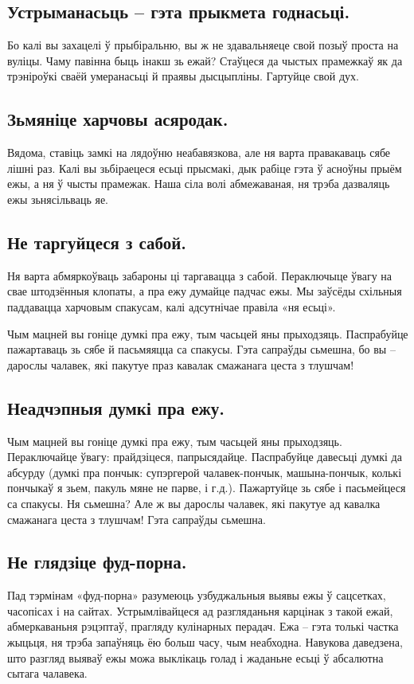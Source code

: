 \subsection{Устрыманасьць – гэта прыкмета годнасьці.}
Бо калі вы захацелі ў прыбіральню, вы ж не здавальняеце свой позыў проста на вуліцы. Чаму павінна быць інакш зь ежай? Стаўцеся да чыстых прамежкаў як да трэніроўкі сваёй умеранасьці й праявы дысцыпліны. Гартуйце свой дух.

\subsection{Зьмяніце харчовы асяродак.}
Вядома, ставіць замкі на лядоўню неабавязкова, але ня варта правакаваць сябе лішні раз. Калі вы зьбіраецеся есьці прысмакі, дык рабіце гэта ў асноўны прыём ежы, а ня ў чысты прамежак. Наша сіла волі абмежаваная, ня трэба дазваляць ежы зьнясільваць яе.

\subsection{Не таргуйцеся з сабой.}
Ня варта абмяркоўваць забароны ці таргавацца з сабой. Пераключыце ўвагу на свае штодзённыя клопаты, а пра ежу думайце падчас ежы. Мы заўсёды схільныя паддавацца харчовым спакусам, калі адсутнічае правіла «ня есьці».

Чым мацней вы гоніце думкі пра ежу, тым часьцей яны прыходзяць. Паспрабуйце пажартаваць зь сябе й пасьмяяцца са спакусы. Гэта сапраўды сьмешна, бо вы – дарослы чалавек, які пакутуе праз кавалак смажанага цеста з тлушчам!

\subsection{Неадчэпныя думкі пра ежу.}
Чым мацней вы гоніце думкі пра ежу, тым часьцей яны прыходзяць. Пераключайце ўвагу: прайдзіцеся, папрысядайце. Паспрабуйце давесьці думкі да абсурду (думкі пра пончык: супэргерой чалавек-пончык, машына-пончык, колькі пончыкаў я зьем, пакуль мяне не парве, і г.д.). Пажартуйце зь сябе і пасьмейцеся са спакусы. Ня сьмешна? Але ж вы дарослы чалавек, які пакутуе ад кавалка смажанага цеста з тлушчам! Гэта сапраўды сьмешна.

\subsection{Не глядзіце фуд-порна.}
Пад тэрмінам «фуд-порна» разумеюць узбуджальныя выявы ежы ў сацсетках, часопісах і на сайтах. Устрымлівайцеся ад разгляданьня карцінак з такой ежай, абмеркаваньня рэцэптаў, прагляду кулінарных перадач. Ежа – гэта толькі частка жыцьця, ня трэба запаўняць ёю больш часу, чым неабходна. Навукова даведзена, што разгляд выяваў ежы можа выклікаць голад і жаданьне есьці ў абсалютна сытага чалавека.

